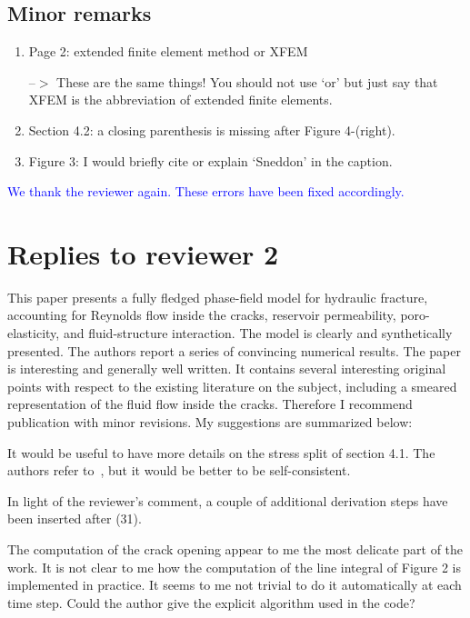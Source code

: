 \documentclass{article}
\newcommand{\KYCom}[1]{\textcolor{red!55!blue}{#1}}
\newcommand{\AuthCom}[1]{\textcolor{blue}{#1}}
\begin{document}
\subsection*{Minor remarks}
\begin{enumerate}
	\item Page 2: extended finite element method or XFEM
	
	--$>$ These are the same things! You should not use `or' but just say that XFEM is the abbreviation of extended finite elements.
	
	\item Section 4.2: a closing parenthesis is missing after Figure 4-(right).
	
	\item  Figure 3: I would briefly cite or explain `Sneddon' in the caption.
\end{enumerate}

    \AuthCom{We thank the reviewer again. These errors have been fixed accordingly.}

\section*{Replies to reviewer 2}
This paper presents a fully fledged phase-field model for hydraulic fracture, accounting for Reynolds flow inside the cracks, reservoir permeability, poro-elasticity, and fluid-structure interaction. The model is clearly and synthetically presented. The authors report a series of convincing numerical results. The paper is interesting and generally well written. It contains several interesting original points with respect to the existing literature on the subject, including a smeared representation of the fluid flow inside the cracks.  Therefore I recommend publication with minor revisions. My suggestions are summarized below:

It would be useful to have more details on the stress split of section 4.1. The authors refer to~\cite{Mikelic-Wheeler-2013a}, but it would be better to be self-consistent.

\KYCom{In light of the reviewer's comment, a couple of additional derivation steps have been inserted after (31).}

The computation of the crack opening appear to me the most delicate part of the work. It is not clear to me how the computation of the line integral of Figure 2 is implemented in practice. It seems to me not trivial to do it automatically at each time step. Could the author give the explicit algorithm used in the code?
\end{document}
